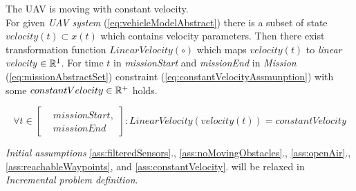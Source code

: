     \begin{assumption}
        {The UAV is moving with constant velocity}\label{ass:constantVelocity}.\\
        For given \emph{UAV system} (\ref{eq:vehicleModelAbstract}) there is a subset of state $velocity(t)\subset x(t)$ which contains velocity parameters. Then there exist transformation function $LinearVelocity(\circ)$ which maps $velocity(t)$  to \emph{linear velocity} $\in\mathbb{R}^1$. For time $t$ in \emph{missionStart} and \emph{missionEnd} in \emph{Mission} (\ref{eq:missionAbstractSet}) constraint (\ref{eq:constantVelocityAssmunption}) with some $constantVelocity \in \mathbb{R}^+$ holds.

        \begin{equation}\label{eq:constantVelocityAssmunption}
            \forall t \in \left[\begin{aligned}&missionStart,\\&missionEnd\end{aligned}\right]: LinearVelocity(velocity(t))=constantVelocity
        \end{equation}    
    \end{assumption}

    \begin{note}
        \emph{Initial assumptions} \ref{ass:filteredSensors}., \ref{ass:noMovingObstacles}., \ref{ass:openAir}., \ref{ass:reachableWaypoints}, and \ref{ass:constantVelocity}. will be relaxed in \emph{Incremental problem definition}.
    \end{note}